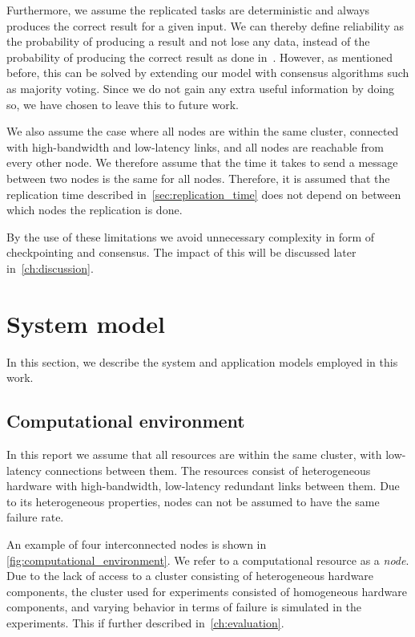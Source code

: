 \documentclass{cslthse-msc}
\begin{document}
Furthermore, we assume the replicated tasks are deterministic and always produces the correct result for a given input. We can thereby define reliability as the probability of producing a result and not lose any data, instead of the probability of producing the correct result as done in~\cite{selfAdaptRel, dynAdaptRepl, relModelWebServices}. However, as mentioned before, this can be solved by extending our model with consensus algorithms such as majority voting. Since we do not gain any extra useful information by doing so, we have chosen to leave this to future work.

We also assume the case where all nodes are within the same cluster, connected with high-bandwidth and low-latency links, and all nodes are reachable from every other node. We therefore assume that the time it takes to send a message between two nodes is the same for all nodes. Therefore, it is assumed that the replication time described in~\cref{sec:replication_time} does not depend on between which nodes the replication is done.

By the use of these limitations we avoid unnecessary complexity in form of checkpointing and consensus. The impact of this will be discussed later in~\cref{ch:discussion}.

\section{System model} \label{sec:design_system_model}
In this section, we describe the system and application models employed in this work.

\subsection{Computational environment} \label{subsec:design_comp_env}
In this report we assume that all resources are within the same cluster, with low-latency connections between them. The resources consist of heterogeneous hardware with high-bandwidth, low-latency redundant links between them. Due to its heterogeneous properties, nodes can not be assumed to have the same failure rate.

An example of four interconnected nodes is shown in \cref{fig:computational_environment}. We refer to a computational resource as a \emph{node}. Due to the lack of access to a cluster consisting of heterogeneous hardware components, the cluster used for experiments consisted of homogeneous hardware components, and varying behavior in terms of failure is simulated in the experiments. This if further described in~\cref{ch:evaluation}.
\end{document}

